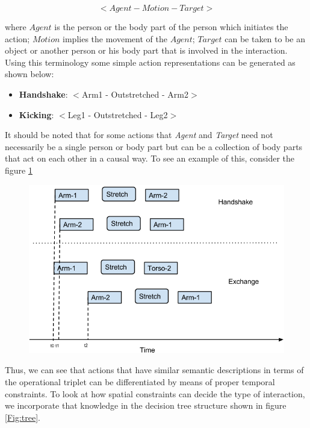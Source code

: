\documentclass[10pt,twocolumn,letterpaper]{article}
\begin{document}
\begin{equation}
<Agent-Motion-Target>
\end{equation}

where $Agent$ is the person or the body part of the person which initiates the action; $Motion$ implies the movement of the $Agent$; $Target$ can be taken to be an object or another person or his body part that is involved in the interaction. Using this terminology some simple action representations can be generated as shown below:

\begin{itemize}
\item \textbf{Handshake}: $<$Arm1 - Outstretched - Arm2$>$
\item \textbf{Kicking}: $<$Leg1 - Outstretched - Leg2$>$
\end{itemize}

It should be noted that for some actions that \textit{Agent} and \textit{Target} need not necessarily be a single person or body part but can be a collection of body parts that act on each other in a causal way. To see an example of this, consider the figure \ref{Fig:act_des}

\begin{figure}[ht]
\centering

  \includegraphics[scale = 0.3]{action_des.png}%
  \label{Fig:act_des}%

\end{figure}

Thus, we can see that actions that have similar semantic descriptions in terms of the operational triplet can be differentiated by means of proper temporal constraints. To look at how spatial constraints can decide the type of interaction, we incorporate that knowledge in the decision tree structure shown in figure \ref{Fig:tree}.
\end{document}
